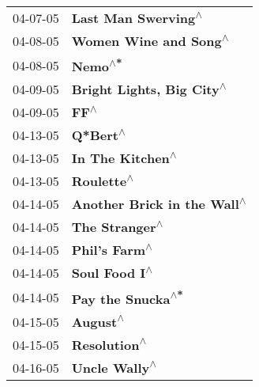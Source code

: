 \begin{supertabular}{p{0.25\columnwidth}p{0.75\columnwidth}}
 04-07-05 &                                                        \textbf{Last Man Swerving\textsuperscript{$\wedge$}} \\
 04-08-05 &                                                      \textbf{Women Wine and Song\textsuperscript{$\wedge$}} \\
 04-08-05 &                                                                    \textbf{Nemo\textsuperscript{$\wedge$*}} \\
 04-09-05 &                                                  \textbf{Bright Lights, Big City\textsuperscript{$\wedge$}} \\
 04-09-05 &                                                                       \textbf{FF\textsuperscript{$\wedge$}} \\
 04-13-05 &                                                                   \textbf{Q*Bert\textsuperscript{$\wedge$}} \\
 04-13-05 &                                                           \textbf{In The Kitchen\textsuperscript{$\wedge$}} \\
 04-13-05 &                                                                 \textbf{Roulette\textsuperscript{$\wedge$}} \\
 04-14-05 &                                                \textbf{Another Brick in the Wall\textsuperscript{$\wedge$}} \\
 04-14-05 &                                                             \textbf{The Stranger\textsuperscript{$\wedge$}} \\
 04-14-05 &                                                              \textbf{Phil's Farm\textsuperscript{$\wedge$}} \\
 04-14-05 &                                                              \textbf{Soul Food I\textsuperscript{$\wedge$}} \\
 04-14-05 &                                                          \textbf{Pay the Snucka\textsuperscript{$\wedge$*}} \\
 04-15-05 &                                                                   \textbf{August\textsuperscript{$\wedge$}} \\
 04-15-05 &                                                               \textbf{Resolution\textsuperscript{$\wedge$}} \\
 04-16-05 &                                                              \textbf{Uncle Wally\textsuperscript{$\wedge$}} \\

\end{supertabular}
